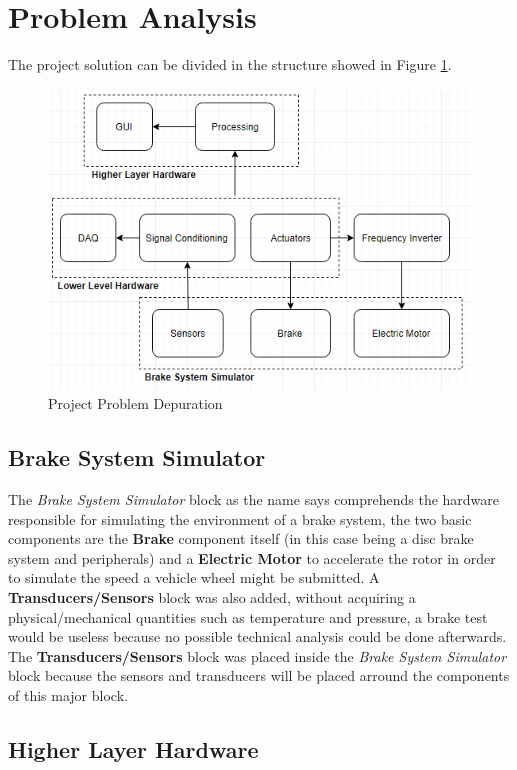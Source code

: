 \section{Problem Analysis}\label{sec:problem-analsysis}

	The project solution can be divided in the structure showed in Figure \ref{fig:projectProblem}.
	
	\begin{figure}[htbp]
		\centering
		\includegraphics[width=.8\textwidth]{figuras/fig-projectProblem}
		\caption{Project Problem Depuration}
		\label{fig:projectProblem}
	\end{figure}
	

	\subsection{Brake System Simulator}\label{ssec:brakeSystemSimulator}
		
		The \textit{Brake System Simulator} block as the name says comprehends the hardware responsible for simulating the environment of a brake system, the two basic components are the \textbf{Brake} component itself (in this case being a disc brake system and peripherals) and a \textbf{Electric Motor} to accelerate the rotor in order to simulate the speed a vehicle wheel might be submitted. A \textbf{Transducers/Sensors} block was also added, without acquiring a physical/mechanical quantities such as temperature and pressure, a brake test would be useless because no possible technical analysis could be done afterwards. The \textbf{Transducers/Sensors} block was placed inside the \textit{Brake System Simulator} block because the sensors and transducers will be placed arround the components of this major block.

	\subsection{Higher Layer Hardware}\label{ssec:higherLayerlHardware}
	
